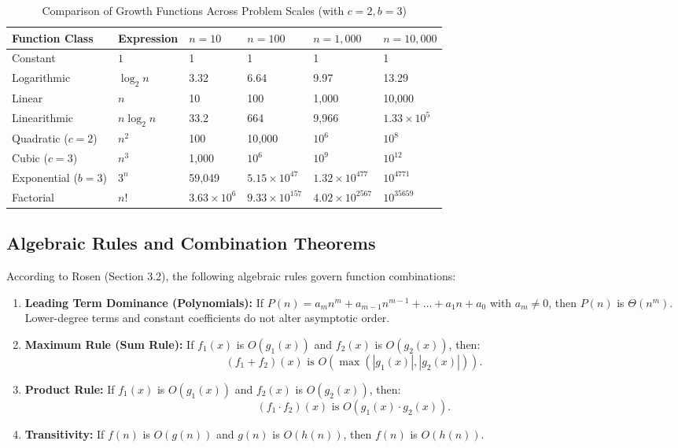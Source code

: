 \documentclass[10pt,a4paper]{article}
\theoremstyle{definition}
\begin{document}
\begin{table}[htbp]
\centering
\small
\caption{Comparison of Growth Functions Across Problem Scales (with $c=2, b=3$)}
\label{tab:growth}
\vspace{2pt}
\begin{tabular}{@{}llllll@{}}
\toprule
\textbf{Function Class} & \textbf{Expression} & $n = 10$ & $n = 100$ & $n = 1,000$ & $n = 10,000$ \\
\midrule
Constant & $1$ & 1 & 1 & 1 & 1 \\
Logarithmic & $\log_2 n$ & 3.32 & 6.64 & 9.97 & 13.29 \\
Linear & $n$ & 10 & 100 & 1,000 & 10,000 \\
Linearithmic & $n \log_2 n$ & 33.2 & 664 & 9,966 & $1.33 \times 10^5$ \\
Quadratic ($c=2$) & $n^2$ & 100 & 10,000 & $10^6$ & $10^8$ \\
Cubic ($c=3$) & $n^3$ & 1,000 & $10^6$ & $10^9$ & $10^{12}$ \\
Exponential ($b=3$) & $3^n$ & 59,049 & $5.15 \times 10^{47}$ & $1.32 \times 10^{477}$ & $10^{4771}$ \\
Factorial & $n!$ & $3.63 \times 10^6$ & $9.33 \times 10^{157}$ & $4.02 \times 10^{2567}$ & $10^{35659}$ \\
\bottomrule
\end{tabular}
\end{table}

\subsection{Algebraic Rules and Combination Theorems}
According to Rosen (Section 3.2), the following algebraic rules govern function combinations:
\begin{enumerate}[leftmargin=*,itemsep=1pt,topsep=1pt]
    \item \textbf{Leading Term Dominance (Polynomials):} If $P(n) = a_m n^m + a_{m-1} n^{m-1} + \dots + a_1 n + a_0$ with $a_m \ne 0$, then $P(n)$ is $\Theta(n^m)$. Lower-degree terms and constant coefficients do not alter asymptotic order.
    \item \textbf{Maximum Rule (Sum Rule):} If $f_1(x)$ is $O(g_1(x))$ and $f_2(x)$ is $O(g_2(x))$, then:
    $$(f_1 + f_2)(x) \text{ is } O(\max(|g_1(x)|, |g_2(x)|)).$$
    \item \textbf{Product Rule:} If $f_1(x)$ is $O(g_1(x))$ and $f_2(x)$ is $O(g_2(x))$, then:
    $$(f_1 \cdot f_2)(x) \text{ is } O(g_1(x) \cdot g_2(x)).$$
    \item \textbf{Transitivity:} If $f(n)$ is $O(g(n))$ and $g(n)$ is $O(h(n))$, then $f(n)$ is $O(h(n))$.
\end{enumerate}
\end{document}
